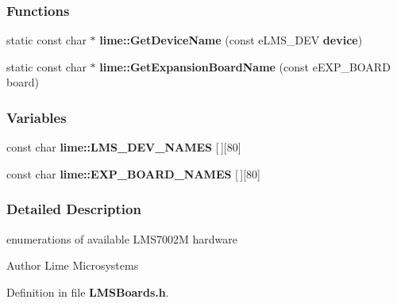 \subsubsection*{Functions}
\begin{DoxyCompactItemize}
\item 
static const char $\ast$ {\bf lime\+::\+Get\+Device\+Name} (const e\+L\+M\+S\+\_\+\+D\+EV {\bf device})
\item 
static const char $\ast$ {\bf lime\+::\+Get\+Expansion\+Board\+Name} (const e\+E\+X\+P\+\_\+\+B\+O\+A\+RD board)
\end{DoxyCompactItemize}
\subsubsection*{Variables}
\begin{DoxyCompactItemize}
\item 
const char {\bf lime\+::\+L\+M\+S\+\_\+\+D\+E\+V\+\_\+\+N\+A\+M\+ES} [$\,$][80]
\item 
const char {\bf lime\+::\+E\+X\+P\+\_\+\+B\+O\+A\+R\+D\+\_\+\+N\+A\+M\+ES} [$\,$][80]
\end{DoxyCompactItemize}


\subsubsection{Detailed Description}
enumerations of available L\+M\+S7002M hardware 

\begin{DoxyAuthor}{Author}
Lime Microsystems 
\end{DoxyAuthor}


Definition in file {\bf L\+M\+S\+Boards.\+h}.

